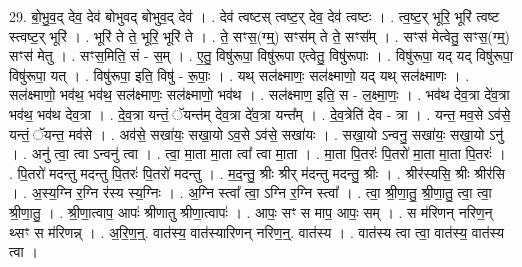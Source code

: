 \documentclass[17pt]{extarticle}
\begin{document}
29. बो॒भु॒व॒द् देव॒ देव॑ बोभुवद् बोभुव॒द् देव॑ । . देव॑ त्वष्टस् त्वष्ट॒र् देव॒ देव॑ त्वष्टः । . त्व॒ष्ट॒र् भूरि॒ भूरि॑ त्वष्ट स्त्वष्ट॒र् भूरि॑ । . भूरि॑ ते ते॒ भूरि॒ भूरि॑ ते । . ते॒ सꣳस॒(ग्म्॒) सꣳस॑म् ते ते॒ सꣳस᳚म् । . सꣳस॑ मेत्वेतु॒ सꣳस॒(ग्म्॒) सꣳस॑ मेतु । . सꣳस॒मिति॒ सं - स॒म् । . ए॒तु॒ विषु॑रूपा॒ विषु॑रूपा एत्वेतु॒ विषु॑रूपाः । . विषु॑रूपा॒ यद् यद् विषु॑रूपा॒ विषु॑रूपा॒ यत् । . विषु॑रूपा॒ इति॒ विषु॑ - रू॒पाः॒ । . यथ् सल॑क्ष्माणः॒ सल॑क्ष्माणो॒ यद् यथ् सल॑क्ष्माणः । . सल॑क्ष्माणो॒ भव॑थ॒ भव॑थ॒ सल॑क्ष्माणः॒ सल॑क्ष्माणो॒ भव॑थ । . सल॑क्ष्माण॒ इति॒ स - ल॒क्ष्मा॒णः॒ । . भव॑थ देव॒त्रा दे॑व॒त्रा भव॑थ॒ भव॑थ देव॒त्रा । . दे॒व॒त्रा यन्तं॒ ॅयन्त॑म् देव॒त्रा दे॑व॒त्रा यन्त᳚म् । . दे॒व॒त्रेति॑ देव - त्रा । . यन्त॒ मव॒से ऽव॑से॒ यन्तं॒ ॅयन्त॒ मव॑से । . अव॑से॒ सखा॑यः॒ सखा॒यो ऽव॒से ऽव॑से॒ सखा॑यः । . सखा॒यो ऽन्वनु॒ सखा॑यः॒ सखा॒यो ऽनु॑ । . अनु॑ त्वा॒ त्वा ऽन्वनु॑ त्वा । . त्वा॒ मा॒ता मा॒ता त्वा᳚ त्वा मा॒ता । . मा॒ता पि॒तरः॑ पि॒तरो॑ मा॒ता मा॒ता पि॒तरः॑ । . पि॒तरो॑ मदन्तु मदन्तु पि॒तरः॑ पि॒तरो॑ मदन्तु । . म॒द॒न्तु॒ श्रीः श्रीर् म॑दन्तु मदन्तु॒ श्रीः । . श्रीर॑स्यसि॒ श्रीः श्रीर॑सि । . अ॒स्य॒ग्नि र॒ग्नि र॑स्य स्य॒ग्निः । . अ॒ग्नि स्त्वा᳚ त्वा॒ ऽग्नि र॒ग्नि स्त्वा᳚ । . त्वा॒ श्री॒णा॒तु॒ श्री॒णा॒तु॒ त्वा॒ त्वा॒ श्री॒णा॒तु॒ । . श्री॒णा॒त्वाप॒ आपः॑ श्रीणातु श्रीणा॒त्वापः॑ । . आपः॒ सꣳ स माप॒ आपः॒ सम् । . स म॑रिणन् नरिण॒न् थ्सꣳ स म॑रिणन्न् । . अ॒रि॒ण॒न्॒. वात॑स्य॒ वात॑स्यारिणन् नरिण॒न्॒. वात॑स्य । . वात॑स्य त्वा त्वा॒ वात॑स्य॒ वात॑स्य त्वा । \newline
\end{document}
